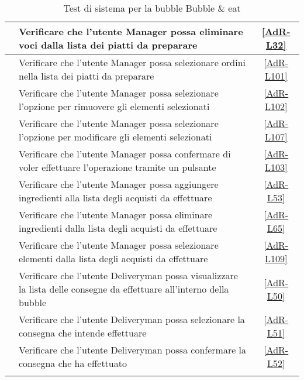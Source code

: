 \begin{longtable}{|c|P{9cm}|c|}
	\hline {} & Verificare che l'utente Manager possa eliminare voci dalla lista dei piatti da preparare & \ref{AdR-L32} \\
	\hline {} & Verificare che l'utente Manager possa selezionare ordini nella lista dei piatti da preparare & \ref{AdR-L101} \\
	\hline {} & Verificare che l'utente Manager possa selezionare l'opzione per rimuovere gli elementi selezionati & \ref{AdR-L102} \\
	\hline {} & Verificare che l'utente Manager possa selezionare l'opzione per modificare gli elementi selezionati & \ref{AdR-L107} \\
	\hline {} & Verificare che l'utente Manager possa confermare di voler effettuare l'operazione tramite un pulsante & \ref{AdR-L103} \\
	\hline {} & Verificare che l'utente Manager possa aggiungere ingredienti alla lista degli acquisti da effettuare & \ref{AdR-L53}\\
	\hline {} & Verificare che l'utente Manager possa eliminare ingredienti dalla lista degli acquisti da effettuare & \ref{AdR-L65} \\
	\hline {} & Verificare che l'utente Manager possa selezionare elementi dalla lista degli acquisti da effettuare & \ref{AdR-L109} \\
	\hline {} & Verificare che l'utente Deliveryman possa visualizzare la lista delle consegne da effettuare all’interno della bubble & \ref{AdR-L50}  \\
	\hline {} & Verificare che l'utente Deliveryman possa selezionare la consegna che intende effettuare & \ref{AdR-L51} \\
	\hline {} & Verificare che l'utente Deliveryman possa confermare la consegna che ha effettuato & \ref{AdR-L52} \\
	\hline
	\caption{Test di sistema per la bubble Bubble \& eat}
\end{longtable}
